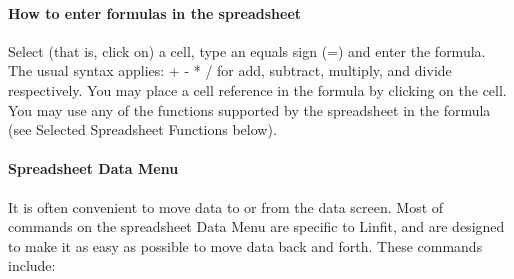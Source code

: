 \paragraph*{How to enter formulas in the spreadsheet}
Select (that is, click on) a cell, type an equals sign (=) and enter
the formula.  The usual syntax applies: + - * / for add, subtract,
multiply, and divide respectively.  You may place a cell reference in
the formula by clicking on the cell.  You may use any of the functions
supported by the spreadsheet in the formula (see Selected Spreadsheet
Functions below).

\paragraph*{Spreadsheet Data Menu}

It is often convenient to move data to or from the data screen.  Most
of commands
on the spreadsheet Data Menu are specific to Linfit, and are designed
to make it as easy as possible to move data back and forth. These
commands include:

